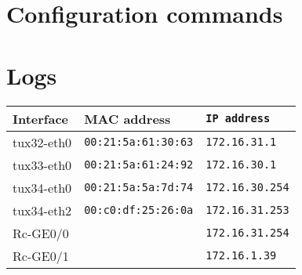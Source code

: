 \documentclass[a4paper, 11pt]{report}
\begin{document}






\restoregeometry

\chapter{Configuration commands}






\fancyhfoffset{0pt}
\chapter{Logs}

\begin{center}
    \begin{tabular}{l | l | l}
        \textbf{Interface} & \textbf{MAC address}       & \texttt{IP address}    \\ \hline
        tux32-eth0         & \texttt{00:21:5a:61:30:63} & \texttt{172.16.31.1  } \\
        tux33-eth0         & \texttt{00:21:5a:61:24:92} & \texttt{172.16.30.1  } \\
        tux34-eth0         & \texttt{00:21:5a:5a:7d:74} & \texttt{172.16.30.254} \\
        tux34-eth2         & \texttt{00:c0:df:25:26:0a} & \texttt{172.16.31.253} \\
        Rc-GE0/0           & \texttt{                 } & \texttt{172.16.31.254} \\
        Rc-GE0/1           & \texttt{                 } & \texttt{172.16.1.39  } \\
    \end{tabular}
\end{center}
\end{document}
